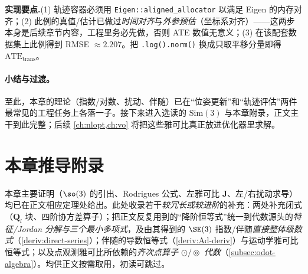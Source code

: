 \begin{note}
\textbf{实现要点.}\;(1) 轨迹容器必须用 \texttt{Eigen::aligned\_allocator} 以满足 Eigen 的内存对齐；(2) 此例的真值/估计已做过\emph{时间对齐}与\emph{外参预估}（坐标系对齐）——这两步本身是后续章节内容，工程里务必先做，否则 ATE 数值无意义；(3) 在该配套数据集上此例得到 RMSE $\approx 2.207$\cite{gaoxiang2019slam14}。把 \texttt{.\allowbreak log().\allowbreak norm()} 换成只取平移分量即得 $\mathrm{ATE}_{\text{trans}}$。
\end{note}

\paragraph{小结与过渡。}至此，本章的理论（指数/对数、扰动、伴随）已在“位姿更新”和“轨迹评估”两件最常见的工程任务上各落一子。接下来进入选读的 $\mathrm{Sim}(3)$ 与本章附录，正文主干到此完整；后续 \cref{ch:nlopt,ch:vo} 将把这些雅可比真正放进优化器里求解。

\section{本章推导附录}
\label{sec:lie-appendix}

本章主要证明（$\so(3)$ 的引出、Rodrigues 公式、左雅可比 $\mathbf{J}$、左/右扰动求导）均已在正文相应定理处给出。此处收录若干\emph{较冗长或较进阶}的补充：两处补充闭式（$\mathbf{Q}_l$ 块、四阶协方差算子）；把正文反复用到的“降阶恒等式”统一到代数源头的\emph{特征/Jordan 分解与三个最小多项式}，及由其得到的 $\SE(3)$ 指数/伴随\emph{直接整体级数式}（\cref{deriv:direct-series}）；伴随的导数恒等式（\cref{deriv:Ad-deriv}）与运动学雅可比恒等式；以及点观测雅可比所依赖的\emph{齐次点算子 $\odot/\circledcirc$ 代数}（\cref{subsec:odot-algebra}）。均供正文按需取用，初读可跳过。

